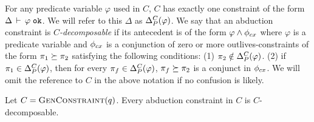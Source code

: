 For any predicate variable $\varphi$ used in $C$, $C$ has exactly one constraint
of the form $\Delta\,\vdash\,\varphi \; \texttt{ok}$. We will refer to this $\Delta$ as
$\Delta_P^C(\varphi)$.
%
%
We say that an abduction constraint is \emph{$C$-decomposable}
if its antecedent is of the form $\varphi \wedge \phi_{cx}$ where $\varphi$ is a predicate variable and
$\phi_{cx}$ is a conjunction of zero or more outlives-constraints of the form
$\pi_1 \succeq \pi_2$ satisfying the following conditions:
(1) $\pi_2 \notin \Delta_P^C(\varphi)$.
(2) if $\pi_1 \in \Delta_P^C(\varphi)$, then for
every $\pi_f \in \Delta_P^C(\varphi)$, $\pi_f \succeq \pi_2$ is a conjunct in $\phi_{cx}$.
%
We will omit the reference to $C$ in the above notation if no confusion is likely.

\begin{lemma}
  \label{lemma:gc-is-decomposable}
  Let $C = \textsc{GenConstraint}(q)$. Every abduction constraint in $C$ is $C$-decomposable.
\end{lemma}



